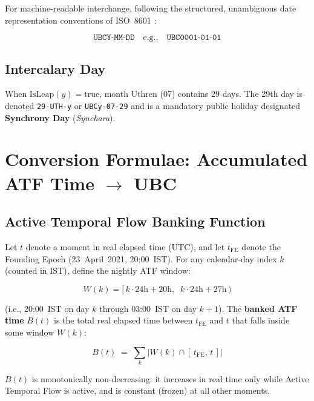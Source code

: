 \documentclass[journal,twoside]{IEEEtran}
\begin{document}
For machine-readable interchange, following the structured, unambiguous date
representation conventions of ISO~8601 \cite{iso8601}:

\begin{equation}
\texttt{UBCY-MM-DD} \quad \text{e.g.,} \quad \texttt{UBC0001-01-01}
\label{eq:iso_notation}
\end{equation}

\subsection{Intercalary Day}

When $\mathrm{IsLeap}(y) = \text{true}$, month Uthren (07) contains 29 days.
The 29th day is denoted \texttt{29-UTH-y} or \texttt{UBCy-07-29} and is a mandatory
public holiday designated \textbf{Synchrony Day} (\textit{Synchara}).

\section{Conversion Formulae: Accumulated ATF Time $\rightarrow$ UBC}
\label{sec:conversion}

\subsection{Active Temporal Flow Banking Function}
\label{sec:banking}

Let $t$ denote a moment in real elapsed time (UTC), and let $t_{\mathrm{FE}}$ denote the
Founding Epoch (23~April~2021, 20:00~IST). For any calendar-day index $k$ (counted in IST),
define the nightly ATF window:

\begin{equation}
W(k) = \big[\, k \cdot 24\text{h} + 20\text{h},\;\; k \cdot 24\text{h} + 27\text{h} \,\big)
\label{eq:window}
\end{equation}

\noindent (i.e., 20:00~IST on day $k$ through 03:00~IST on day $k{+}1$). The
\textbf{banked ATF time} $B(t)$ is the total real elapsed time between $t_{\mathrm{FE}}$ and
$t$ that falls inside some window $W(k)$:

\begin{equation}
B(t) \;=\; \sum_{k} \left| W(k) \cap [\,t_{\mathrm{FE}},\, t\,] \right|
\label{eq:banked}
\end{equation}

\noindent $B(t)$ is monotonically non-decreasing: it increases in real time only while
Active Temporal Flow is active, and is constant (frozen) at all other moments.
\end{document}
